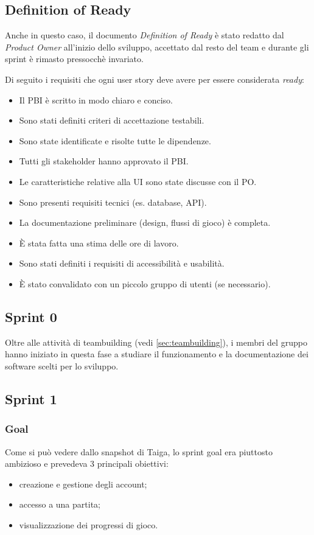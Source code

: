 \documentclass{article}
\begin{document}
\subsection{Definition of Ready}
Anche in questo caso, il documento \textit{Definition of Ready} è stato redatto dal \textit{Product Owner} all'inizio
dello sviluppo, accettato dal resto del team e durante gli sprint è rimasto pressocchè invariato.

Di seguito i requisiti che ogni user story deve avere per essere considerata \textit{ready}:

\begin{itemize}
    \item Il PBI è scritto in modo chiaro e conciso.
    \item Sono stati definiti criteri di accettazione testabili.
    \item Sono state identificate e risolte tutte le dipendenze.
    \item Tutti gli stakeholder hanno approvato il PBI.
    \item Le caratteristiche relative alla UI sono state discusse con il PO.
    \item Sono presenti requisiti tecnici (es. database, API).
    \item La documentazione preliminare (design, flussi di gioco) è completa.
    \item È stata fatta una stima delle ore di lavoro.
    \item Sono stati definiti i requisiti di accessibilità e usabilità.
    \item È stato convalidato con un piccolo gruppo di utenti (se necessario).
\end{itemize}

\subsection{Sprint 0}
Oltre alle attività di teambuilding (vedi \ref{sec:teambuilding}), i membri del gruppo hanno iniziato in questa fase a studiare
il funzionamento e la documentazione dei software scelti per lo sviluppo.

\subsection{Sprint 1}

\subsubsection{Goal}
Come si può vedere dallo snapshot di Taiga, lo sprint goal era piuttosto ambizioso e prevedeva 3 principali obiettivi:
\begin{itemize}
    \item creazione e gestione degli account;
    \item accesso a una partita;
    \item visualizzazione dei progressi di gioco.
\end{itemize}
\end{document}
